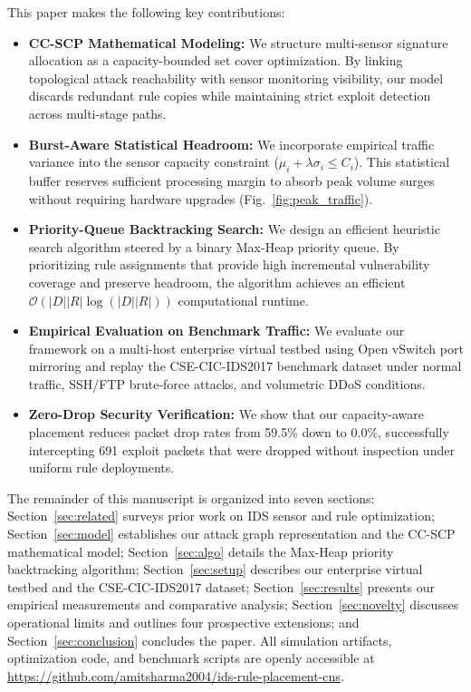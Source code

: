 \documentclass[conference]{IEEEtran}
\begin{document}
This paper makes the following key contributions:
\begin{itemize}
    \item \textbf{CC-SCP Mathematical Modeling:} We structure multi-sensor signature allocation as a capacity-bounded set cover optimization. By linking topological attack reachability with sensor monitoring visibility, our model discards redundant rule copies while maintaining strict exploit detection across multi-stage paths.
    \item \textbf{Burst-Aware Statistical Headroom:} We incorporate empirical traffic variance into the sensor capacity constraint ($\mu_i + \lambda\sigma_i \le C_i$). This statistical buffer reserves sufficient processing margin to absorb peak volume surges without requiring hardware upgrades (Fig.~\ref{fig:peak_traffic}).
    \item \textbf{Priority-Queue Backtracking Search:} We design an efficient heuristic search algorithm steered by a binary Max-Heap priority queue. By prioritizing rule assignments that provide high incremental vulnerability coverage and preserve headroom, the algorithm achieves an efficient $\mathcal{O}(|D||R|\log(|D||R|))$ computational runtime.
    \item \textbf{Empirical Evaluation on Benchmark Traffic:} We evaluate our framework on a multi-host enterprise virtual testbed using Open vSwitch port mirroring and replay the CSE-CIC-IDS2017 benchmark dataset under normal traffic, SSH/FTP brute-force attacks, and volumetric DDoS conditions.
    \item \textbf{Zero-Drop Security Verification:} We show that our capacity-aware placement reduces packet drop rates from 59.5\% down to 0.0\%, successfully intercepting 691 exploit packets that were dropped without inspection under uniform rule deployments.
\end{itemize}

The remainder of this manuscript is organized into seven sections: Section~\ref{sec:related} surveys prior work on IDS sensor and rule optimization; Section~\ref{sec:model} establishes our attack graph representation and the CC-SCP mathematical model; Section~\ref{sec:algo} details the Max-Heap priority backtracking algorithm; Section~\ref{sec:setup} describes our enterprise virtual testbed and the CSE-CIC-IDS2017 dataset; Section~\ref{sec:results} presents our empirical measurements and comparative analysis; Section~\ref{sec:novelty} discusses operational limits and outlines four prospective extensions; and Section~\ref{sec:conclusion} concludes the paper. All simulation artifacts, optimization code, and benchmark scripts are openly accessible at \url{https://github.com/amitsharma2004/ids-rule-placement-cns}.
\end{document}
